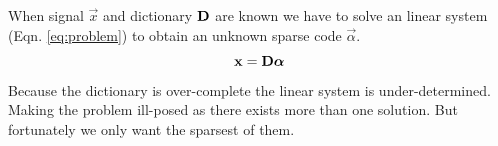 When signal $\vec{x}$ and dictionary $\boldsymbol{\mathrm{D}}$ are known we have to solve
an linear system (Eqn. \ref{eq:problem}) to obtain an unknown
sparse code $\vec{\alpha}$.
\begin{equation}
 \boldsymbol{\mathrm{x}} = \boldsymbol{\mathrm{D}}\boldsymbol{\mathrm{\alpha}}\label{eq:problem} 
\end{equation}
Because the dictionary is over-complete the linear system is under-determined.
Making the problem ill-posed as there exists more than one solution. 
But fortunately we only want the sparsest of them. 





